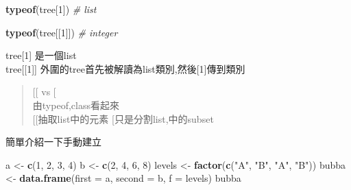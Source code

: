 \documentclass[]{book}
\newenvironment{Shaded}{\begin{snugshade}}{\end{snugshade}}
\newcommand{\KeywordTok}[1]{\textcolor[rgb]{0.13,0.29,0.53}{\textbf{#1}}}
\newcommand{\DataTypeTok}[1]{\textcolor[rgb]{0.13,0.29,0.53}{#1}}
\newcommand{\DecValTok}[1]{\textcolor[rgb]{0.00,0.00,0.81}{#1}}
\newcommand{\StringTok}[1]{\textcolor[rgb]{0.31,0.60,0.02}{#1}}
\newcommand{\CommentTok}[1]{\textcolor[rgb]{0.56,0.35,0.01}{\textit{#1}}}
\newcommand{\OperatorTok}[1]{\textcolor[rgb]{0.81,0.36,0.00}{\textbf{#1}}}
\newcommand{\NormalTok}[1]{#1}
\theoremstyle{definition}
\theoremstyle{definition}
\theoremstyle{definition}
\theoremstyle{remark}
\begin{document}
\begin{Shaded}
\begin{Highlighting}[]
\KeywordTok{typeof}\NormalTok{(tree[}\DecValTok{1}\NormalTok{]) }\CommentTok{# list}
\end{Highlighting}
\end{Shaded}

\begin{Shaded}
\end{Shaded}

\begin{Shaded}
\begin{Highlighting}[]
\KeywordTok{typeof}\NormalTok{(tree[[}\DecValTok{1}\NormalTok{]]) }\CommentTok{# integer}
\end{Highlighting}
\end{Shaded}

tree{[}1{]} 是一個list\\
tree{[}{[}1{]}{]}
外圍的tree\protect\hyperlink{section-1}{}首先被解讀為list類別,然後{[}1{]}傳到類別

\begin{quote}
{[}{[} vs {[}\\
由typeof,class看起來\\
{[}{[}抽取list中的元素 {[}只是分割list,中的subset
\end{quote}

簡單介紹一下手動建立

\begin{Shaded}
\begin{Highlighting}[]
\NormalTok{a <-}\StringTok{ }\KeywordTok{c}\NormalTok{(}\DecValTok{1}\NormalTok{, }\DecValTok{2}\NormalTok{, }\DecValTok{3}\NormalTok{, }\DecValTok{4}\NormalTok{)}
\NormalTok{b <-}\StringTok{ }\KeywordTok{c}\NormalTok{(}\DecValTok{2}\NormalTok{, }\DecValTok{4}\NormalTok{, }\DecValTok{6}\NormalTok{, }\DecValTok{8}\NormalTok{)}
\NormalTok{levels <-}\StringTok{ }\KeywordTok{factor}\NormalTok{(}\KeywordTok{c}\NormalTok{(}\StringTok{"A"}\NormalTok{, }\StringTok{"B"}\NormalTok{, }\StringTok{"A"}\NormalTok{, }\StringTok{"B"}\NormalTok{))}
\NormalTok{bubba <-}\StringTok{ }\KeywordTok{data.frame}\NormalTok{(}\DataTypeTok{first =}\NormalTok{ a,}
                      \DataTypeTok{second =}\NormalTok{ b,}
                      \DataTypeTok{f =}\NormalTok{ levels)}
\NormalTok{bubba}
\end{Highlighting}
\end{Shaded}
\end{document}

